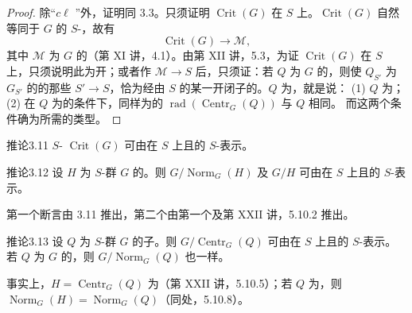 \begin{proof}
除“$c\ell$ ”外，证明同 3.3。只须证明 $\operatorname{Crit}(G)$ 在 $S$ 上。$\operatorname{Crit}(G)$ 自然等同于 $G$ 的 $S$-，故有
\[\operatorname{Crit}(G)\longrightarrow\mathcal M,\]
其中 $\mathcal M$ 为 $G$ 的（第 XI 讲，4.1）。由第 XII 讲，5.3，为证 $\operatorname{Crit}(G)$ 在 $S$ 上，只须说明此为开；或者作 $\mathcal M\to S$ 后，只须证：若 $Q$ 为 $G$ 的，则使 $Q_{S'}$ 为 $G_{S'}$ 的的那些 $S'\to S$，恰为经由 $S$ 的某一开闭子的。$Q$ 为，就是说：
(1) $Q$ 为；
(2) 在 $Q$ 为的条件下，同样为的 $\operatorname{rad}(\operatorname{Centr}_G(Q))$ 与 $Q$ 相同。
而这两个条件确为所需的类型。
\end{proof}
\begin{SGAresult}{推论}{3.11}
$S$- $\operatorname{Crit}(G)$ 可由在 $S$ 上且的 $S$-表示。
\end{SGAresult}
\begin{SGAresult}{推论}{3.12}
设 $H$ 为 $S$-群 $G$ 的。则 $G/\operatorname{Norm}_G(H)$ 及 $G/H$ 可由在 $S$ 上且的 $S$-表示。
\end{SGAresult}
第一个断言由 3.11 推出，第二个由第一个及第 XXII 讲，5.10.2 推出。
\begin{SGAresult}{推论}{3.13}
设 $Q$ 为 $S$-群 $G$ 的子。则 $G/\operatorname{Centr}_G(Q)$ 可由在 $S$ 上且的 $S$-表示。若 $Q$ 为 $G$ 的，则 $G/\operatorname{Norm}_G(Q)$ 也一样。
\end{SGAresult}
事实上，$H=\operatorname{Centr}_G(Q)$ 为（第 XXII 讲，5.10.5）；若 $Q$ 为，则 $\operatorname{Norm}_G(H)=\operatorname{Norm}_G(Q)$（同处，5.10.8）。
